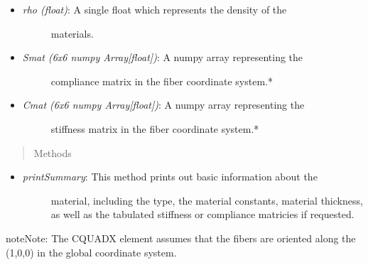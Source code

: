 \documentclass[letterpaper,10pt,english]{sphinxmanual}
\begin{document}
\begin{fulllineitems}
\begin{itemize}
\begin{description}
\end{description}

\item {} \begin{description}
\item[{\emph{rho (float)}: A single float which represents the density of the}] \leavevmode
materials.

\end{description}

\item {} \begin{description}
\item[{\emph{Smat (6x6 numpy Array{[}float{]})}: A numpy array representing the}] \leavevmode
compliance matrix in the fiber coordinate system.*

\end{description}

\item {} \begin{description}
\item[{\emph{Cmat (6x6 numpy Array{[}float{]})}: A numpy array representing the}] \leavevmode
stiffness matrix in the fiber coordinate system.*

\end{description}

\end{itemize}
\begin{quote}\begin{description}
\item[{Methods}] \leavevmode
\end{description}\end{quote}
\begin{itemize}
\item {} \begin{description}
\item[{\emph{printSummary}: This method prints out basic information about the}] \leavevmode
material, including the type, the material constants, material
thickness, as well as the tabulated stiffness or compliance
matricies if requested.

\end{description}

\end{itemize}

\begin{notice}{note}{Note:}
The CQUADX element assumes that the fibers are oriented along
the (1,0,0) in the global coordinate system.
\end{notice}


\end{fulllineitems}
\end{document}
